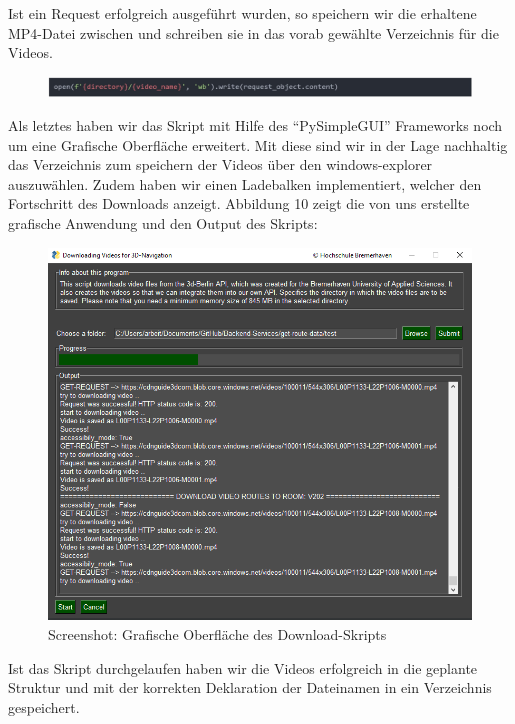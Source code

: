Ist ein Request erfolgreich ausgeführt wurden, so speichern wir die erhaltene MP4-Datei zwischen und schreiben sie in das vorab gewählte Verzeichnis für die Videos.

\begin{figure}[H]
    \includegraphics[width=\textwidth]{Figures/3DNavigator/code04.jpg}
    \centering
\end{figure}\vspace{-4.5mm}

Als letztes haben wir das Skript mit Hilfe des “PySimpleGUI”  Frameworks noch um eine Grafische Oberfläche erweitert. Mit diese sind wir in der Lage nachhaltig das Verzeichnis zum speichern der Videos über den windows-explorer auszuwählen. Zudem haben wir einen Ladebalken implementiert, welcher den Fortschritt des Downloads anzeigt. Abbildung 10 zeigt die von uns erstellte grafische Anwendung und den Output des Skripts:

\begin{figure}[H]
    \includegraphics[width=\textwidth]{Figures/3DNavigator/create_videodata_pic.png}
    \caption{Screenshot: Grafische Oberfläche des Download-Skripts}
    \label{fig:integration}
    \centering
\end{figure}\vspace{-2.5mm}

Ist das Skript durchgelaufen haben wir die Videos erfolgreich in die geplante Struktur und mit der korrekten Deklaration der Dateinamen in ein Verzeichnis gespeichert. 

